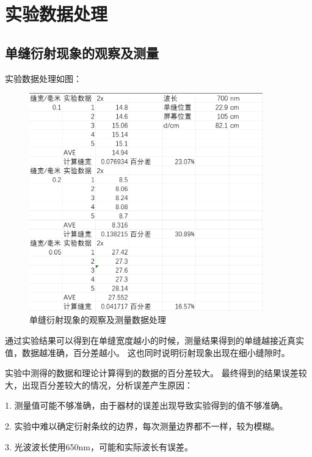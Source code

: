 \documentclass{ctexart}
\begin{document}
\section{实验数据处理}
  \subsection{单缝衍射现象的观察及测量}
  实验数据处理如图：
  \begin{figure}[H]
    \centering
    \includegraphics[width=0.9\textwidth,height=0.3\textheight]{danfengshujv.png}
    \caption{单缝衍射现象的观察及测量数据处理}
  \end{figure}

  通过实验结果可以得到在单缝宽度越小的时候，测量结果得到的单缝越接近真实值，数据越准确，百分差越小。
  这也同时说明衍射现象出现在细小缝隙时。

  实验中测得的数据和理论计算得到的数据的百分差较大。
  最终得到的结果误差较大，出现百分差较大的情况，分析误差产生原因：

  1.  测量值可能不够准确，由于器材的误差出现导致实验得到的值不够准确。

  2.  实验中难以确定衍射条纹的边界，每次测量边界都不一样，较为模糊。

  3.  光波波长使用650nm，可能和实际波长有误差。
\end{document}
